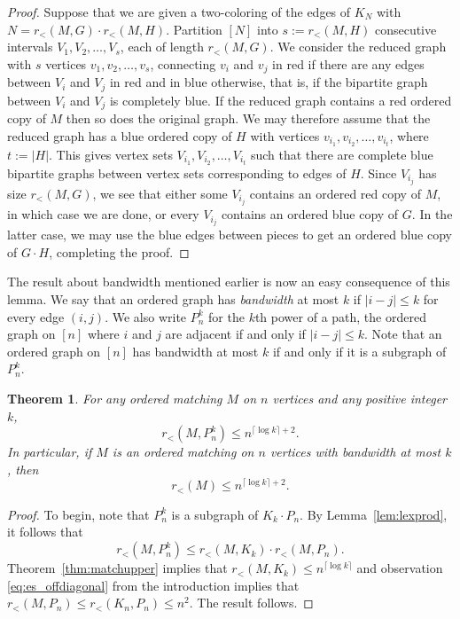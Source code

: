 \documentclass[11pt]{article}
\newtheorem{theorem}{Theorem}[section]
\begin{document}
\begin{proof}
Suppose that we are given a two-coloring of the edges of $K_{N}$ with $N = r_<(M, G) \cdot r_<(M, H)$.  Partition $[N]$ into $s := r_<(M, H)$ consecutive
intervals $V_{1}, V_2, \dots, V_s$, each of length $r_<(M, G)$. We consider the reduced graph with $s$ vertices $v_1, v_2, \dots, v_s$, connecting $v_i$ and $v_j$ in red if there are any edges between $V_i$ and $V_j$ in red and in blue otherwise, that is, if the bipartite graph between $V_i$ and $V_j$ is completely blue. If the reduced graph contains a red ordered copy of $M$ then so does the original graph. We may therefore assume that the reduced graph has a blue ordered copy of $H$ with vertices $v_{i_1}, v_{i_2}, \dots, v_{i_t}$, where $t := |H|$. This gives vertex sets $V_{i_1}, V_{i_2}, \dots, V_{i_t}$ such that there are complete blue bipartite graphs between vertex sets corresponding to edges of $H$. Since $V_{i_j}$ has size $r_<(M,G)$, we see that either some $V_{i_j}$ contains an ordered red copy of $M$, in which case we are done, or every $V_{i_j}$ contains an ordered blue copy of $G$. In the latter case, we may use the blue edges between pieces to get an ordered blue copy of $G \cdot H$, completing the proof.
\end{proof}

The result about bandwidth mentioned earlier is now an easy consequence of this lemma. We say that an ordered graph has {\it bandwidth} at most $k$ if $|i-j| \leq k$ for every edge $(i,j)$. We also write $P_n^k$ for the $k$th power of a path, the ordered graph on $[n]$ where $i$ and $j$ are adjacent if and only if $|i - j| \leq k$. Note that an ordered graph on $[n]$ has bandwidth at most $k$ if and only if it is a subgraph of $P_n^k$.

\begin{theorem} \label{thm:bandwidth}
For any ordered matching $M$ on $n$ vertices and any positive integer $k$,
\[r_< (M, P_n^k) \leq n^{\lceil \log k \rceil + 2}.\]
In particular, if $M$ is an ordered matching on $n$ vertices with bandwidth at most $k$, then
\[r_<(M) \leq n^{\lceil \log k \rceil + 2}.\]
\end{theorem}

\begin{proof}
To begin, note that $P_n^k$ is a subgraph of $K_k \cdot P_n$. By Lemma~\ref{lem:lexprod}, it follows that
\[r_<(M, P_n^k) \leq r_<(M, K_k) \cdot r_<(M, P_n).\]
Theorem~\ref{thm:matchupper} implies that $r_<(M, K_k) \leq n^{\lceil \log k \rceil}$ and observation
\eqref{eq:es_offdiagonal} from the introduction implies that $r_<(M,P_n) \le r_<(K_n,P_n) \le n^2$. The result follows.
\end{proof}
\end{document}
